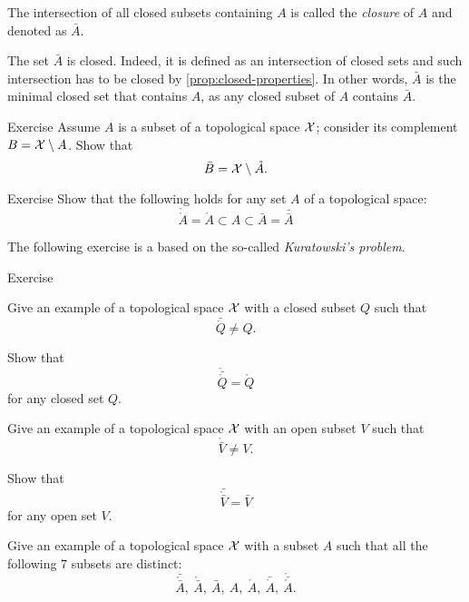 The intersection of all closed subsets containing $A$ is called the \emph{closure} of $A$ and denoted as $\bar A$.

The set $\bar A$ is closed.
Indeed, it is defined as an intersection of closed sets and such intersection has to be closed by \ref{prop:closed-properties}.
In other words, $\bar A$ is the minimal closed set that contains $A$, 
as any closed subset of $A$ contains $\bar A$.


\begin{thm}{Exercise}\label{ex:closure-interior-complement}
Assume $A$ is a subset of a topological space $\mathcal{X}$;
consider its complement $B=\mathcal{X}\setminus A$.
Show that 
\[\bar B=\mathcal{X}\setminus \mathring A.\]
\end{thm}

\begin{thm}{Exercise}\label{ex:closure-closure}
Show that the following holds for any set $A$ of a topological space:
\[\mathring{\mathring A}=\mathring A\subset A\subset \bar A=\bar{\bar A}\]

\end{thm}

The following exercise is a based on the so-called \textit{Kuratowski's problem}.

\begin{thm}{Exercise}\label{ex:kuratowski}

\begin{subthm}{}
Give an example of a topological space $\mathcal{X}$ with a closed subset $Q$ such that
 \[\bar{\mathring Q}\ne Q.\]
\end{subthm}

\begin{subthm}{}
Show that 
\[\mathring{\bar{\mathring Q}}=\mathring Q\]
for any closed set $Q$.
\end{subthm}

\begin{subthm}{}
Give an example of a topological space $\mathcal{X}$ with an open subset $V$ such that
 \[\mathring{\bar V}\ne V.\]
\end{subthm}

\begin{subthm}{}
Show that 
\[\bar{\mathring{\bar V}}=\bar V\]
for any open set $V$.
\end{subthm}

\begin{subthm}{}
 Give an example of a topological space $\mathcal{X}$ with a subset $A$ such that all the following 7 subsets are distinct:
\[\bar{\mathring{\bar A}},\ \mathring{\bar A},\ \bar A,\  A,\  \mathring A,\ \bar{\mathring A},\ \mathring{\bar{\mathring A}}.\]
\end{subthm}

\end{thm}


